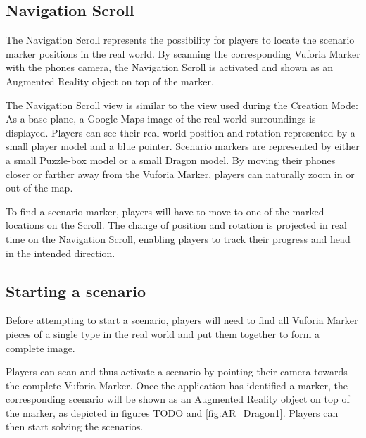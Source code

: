 \documentclass{sigchi-ext}
\begin{document}
\subsection{Navigation Scroll}

The Navigation Scroll represents the possibility for players to locate the scenario marker positions in the real world. By scanning the corresponding Vuforia Marker with the phones camera, the Navigation Scroll is activated and shown as an Augmented Reality object on top of the marker.

The Navigation Scroll view is similar to the view used during the Creation Mode: As a base plane, a Google Maps image of the real world surroundings is displayed. Players can see their real world position and rotation represented by a small player model and a blue pointer. Scenario markers are represented by either a small Puzzle-box model or a small Dragon model. By moving their phones closer or farther away from the Vuforia Marker, players can naturally zoom in or out of the map.

To find a scenario marker, players will have to move to one of the marked locations on the Scroll. The change of position and rotation is projected in real time on the Navigation Scroll, enabling players to track their progress and head in the intended direction.

\subsection{Starting a scenario}

Before attempting to start a scenario, players will need to find all Vuforia Marker pieces of a single type in the real world and put them together to form a complete image. 

Players can scan and thus activate a scenario by pointing their camera towards the complete Vuforia Marker. Once the application has identified a marker, the corresponding scenario will be shown as an Augmented Reality object on top of the marker, as depicted in figures TODO and \ref{fig:AR_Dragon1}. Players can then start solving the scenarios.

\end{document}
